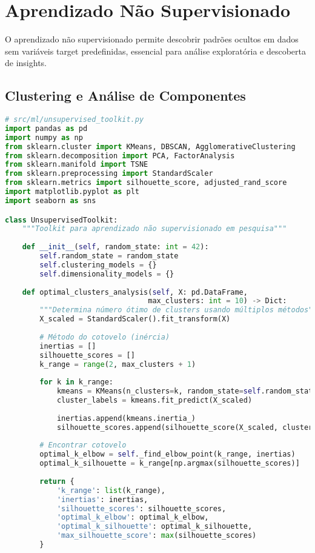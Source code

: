 \section{Aprendizado Não Supervisionado}

O aprendizado não supervisionado permite descobrir padrões ocultos em dados sem variáveis target predefinidas, essencial para análise exploratória e descoberta de insights.

\subsection{Clustering e Análise de Componentes}

\begin{pythonbox}
\begin{lstlisting}[language=Python]
# src/ml/unsupervised_toolkit.py
import pandas as pd
import numpy as np
from sklearn.cluster import KMeans, DBSCAN, AgglomerativeClustering
from sklearn.decomposition import PCA, FactorAnalysis
from sklearn.manifold import TSNE
from sklearn.preprocessing import StandardScaler
from sklearn.metrics import silhouette_score, adjusted_rand_score
import matplotlib.pyplot as plt
import seaborn as sns

class UnsupervisedToolkit:
    """Toolkit para aprendizado não supervisionado em pesquisa"""
    
    def __init__(self, random_state: int = 42):
        self.random_state = random_state
        self.clustering_models = {}
        self.dimensionality_models = {}
        
    def optimal_clusters_analysis(self, X: pd.DataFrame, 
                                 max_clusters: int = 10) -> Dict:
        """Determina número ótimo de clusters usando múltiplos métodos"""
        X_scaled = StandardScaler().fit_transform(X)
        
        # Método do cotovelo (inércia)
        inertias = []
        silhouette_scores = []
        k_range = range(2, max_clusters + 1)
        
        for k in k_range:
            kmeans = KMeans(n_clusters=k, random_state=self.random_state, n_init=10)
            cluster_labels = kmeans.fit_predict(X_scaled)
            
            inertias.append(kmeans.inertia_)
            silhouette_scores.append(silhouette_score(X_scaled, cluster_labels))
        
        # Encontrar cotovelo
        optimal_k_elbow = self._find_elbow_point(k_range, inertias)
        optimal_k_silhouette = k_range[np.argmax(silhouette_scores)]
        
        return {
            'k_range': list(k_range),
            'inertias': inertias,
            'silhouette_scores': silhouette_scores,
            'optimal_k_elbow': optimal_k_elbow,
            'optimal_k_silhouette': optimal_k_silhouette,
            'max_silhouette_score': max(silhouette_scores)
        }
    \end{lstlisting}
\end{pythonbox}
